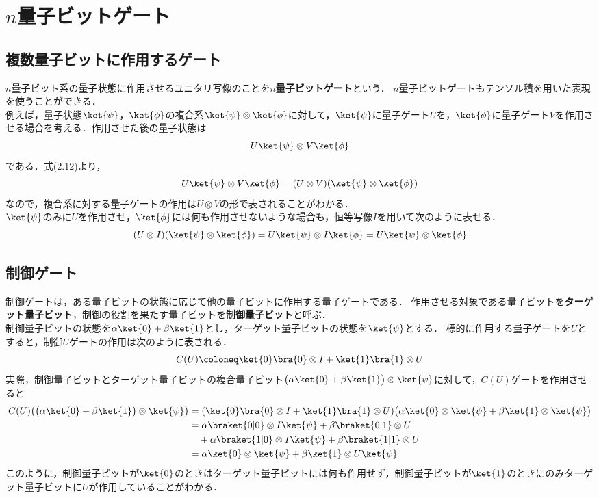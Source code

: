 \section{$n$量子ビットゲート}

\subsection{複数量子ビットに作用するゲート}
$n$量子ビット系の量子状態に作用させるユニタリ写像のことを\textbf{$n$量子ビットゲート}という．
$n$量子ビットゲートもテンソル積を用いた表現を使うことができる．\\
例えば，量子状態$\ket{\psi}$，$\ket{\phi}$の複合系$\ket{\psi}\otimes\ket{\phi}$に対して，$\ket{\psi}$に量子ゲート$U$を，$\ket{\phi}$に量子ゲート$V$を作用させる場合を考える．作用させた後の量子状態は
\[
  U\ket{\psi}\otimes V\ket{\phi}
\]
である．式(2.12)より，
\[
  U\ket{\psi}\otimes V\ket{\phi} = (U\otimes V)(\ket{\psi}\otimes\ket{\phi})
\]
なので，複合系に対する量子ゲートの作用は$U\otimes V$の形で表されることがわかる．\\
$\ket{\psi}$のみに$U$を作用させ，$\ket{\phi}$には何も作用させないような場合も，恒等写像$I$を用いて次のように表せる．
\[
  (U\otimes I)(\ket{\psi}\otimes\ket{\phi}) = U\ket{\psi}\otimes I\ket{\phi} = U\ket{\psi}\otimes\ket{\phi}
\]

\subsection{制御ゲート}

制御ゲートは，ある量子ビットの状態に応じて他の量子ビットに作用する量子ゲートである．
作用させる対象である量子ビットを\textbf{ターゲット量子ビット}，制御の役割を果たす量子ビットを\textbf{制御量子ビット}と呼ぶ．\\
制御量子ビットの状態を$\alpha\ket{0}+\beta\ket{1}$とし，ターゲット量子ビットの状態を$\ket{\psi}$とする．
標的に作用する量子ゲートを$U$とすると，制御$U$ゲートの作用は次のように表される．
\[
  C(U) \coloneq \ket{0}\bra{0}\otimes I + \ket{1}\bra{1}\otimes U
\]
実際，制御量子ビットとターゲット量子ビットの複合量子ビット$\big(\alpha\ket{0}+\beta\ket{1}\big)\otimes\ket{\psi}$に対して，$C(U)$ゲートを作用させると
\begin{align*}
  C(U)\big(\big(\alpha\ket{0}+\beta\ket{1}\big)\otimes\ket{\psi}\big)
  &= (\ket{0}\bra{0}\otimes I + \ket{1}\bra{1}\otimes U)\big(\alpha\ket{0}\otimes\ket{\psi} + \beta\ket{1}\otimes\ket{\psi}\big) \\
  &= \alpha\braket{0|0}\otimes I\ket{\psi} + \beta\braket{0|1}\otimes U \\
  &\quad + \alpha\braket{1|0}\otimes I\ket{\psi} + \beta\braket{1|1}\otimes U \\
  &= \alpha\ket{0}\otimes\ket{\psi} + \beta\ket{1}\otimes U\ket{\psi} 
\end{align*}
このように，制御量子ビットが$\ket{0}$のときはターゲット量子ビットには何も作用せず，制御量子ビットが$\ket{1}$のときにのみターゲット量子ビットに$U$が作用していることがわかる．